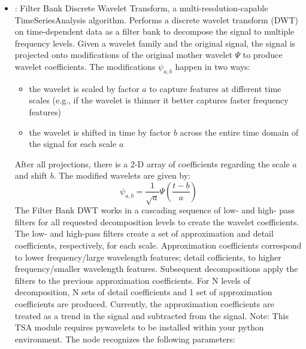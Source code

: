 \begin{itemize}
    \item {}:
      Filter Bank Discrete Wavelet Transform, a multi-resolution-capable TimeSeriesAnalysis
      algorithm. Performs a discrete wavelet transform (DWT) on time-dependent data as a filter bank
      to decompose the         signal to multiple frequency levels. Given a wavelet family and the
      original signal, the signal is projected         onto modifications of the original mother
      wavelet $\Psi$ to produce wavelet coefficients. The modifications         $\psi_{a,b}$ happen
      in two ways:         \\         \begin{itemize}           \item the wavelet is scaled by
      factor $a$ to capture features at different time scales (e.g., if the wavelet           is
      thinner it better captures faster frequency features)           \item the wavelet is shifted
      in time by factor $b$ across the entire time domain of the signal for each           scale $a$
      \end{itemize}         After all projections, there is a 2-D array of coefficients regarding
      the scale $a$ and shift $b$. The modified         wavelets are given by:         \\
      \begin{equation*}            \psi_{a,b} = \frac{1}{\sqrt{a}} \Psi(\frac{t-b}{a})
      \end{equation*}         The Filter Bank DWT works in a cascading sequence of low- and high-
      pass filters for all requested decomposition         levels to create the wavelet
      coefficients. The low- and high-pass filters create a set of approximation and         detail
      coefficients, respectively, for each scale. Approximation coefficients correspond to lower
      frequency/large wavelength features; detail cofficients, to higher frequency/smaller
      wavelength features.         Subsequent decompositions apply the filters to the previous
      approximation coefficients. For N levels of         decomposition, N sets of detail
      coefficients and 1 set of approximation coefficients are produced. Currently,         the
      approximation coefficients are treated as a trend in the signal and subtracted from the
      signal.         Note: This TSA module requires pywavelets to be installed within your python
      environment.
      The  node recognizes the following parameters:
        \begin{itemize}

\end{itemize}
\end{itemize}
